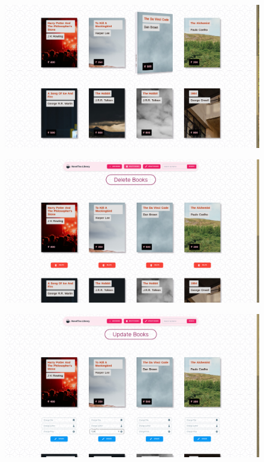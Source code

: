 \documentclass[11pt]{article}
\begin{document}
\begin{figure}[H]
    \centering
    \includegraphics[width=.95\textwidth]{screenshots/books.png}
    \caption{ }
\end{figure}

\begin{figure}[H]
    \centering
    \includegraphics[width=.95\textwidth]{screenshots/delete.png}
    \caption{ }
\end{figure}
\begin{figure}[H]

    \centering
    \includegraphics[width=.95\textwidth]{screenshots/update.png}
    \caption{ }
\end{figure}
\end{document}
